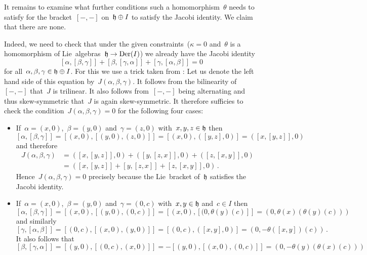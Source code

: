 \begin{example}
  It remains to examine what further conditions such a homomorphism~$\theta$ needs to satisfy for the bracket~$[-,-]$ on~$\mathfrak{h} \oplus I$ to satisfy the Jacobi identity.
  We claim that there are none.
  
  Indeed, we need to check that under the given constraints~($\kappa = 0$ and~$\theta$ is a homomorphism of Lie~algebras~$\mathfrak{h} \to \operatorname{Der}(I)$) we already have the Jacobi identity
  \[
      [\alpha, [\beta, \gamma]]
    + [\beta, [\gamma, \alpha]]
    + [\gamma, [\alpha, \beta]]
    =
    0
  \]
  for all~$\alpha, \beta, \gamma \in \mathfrak{h} \oplus I$.
  For this we use a trick taken from \cite{semidirect_jacobi}:
  Let us denote the left hand side of this equation by~$J(\alpha, \beta, \gamma)$.
  It follows from the bilinearity of~$[-,-]$ that~$J$ is trilinear.
  It also follows from~$[-,-]$ being alternating and thus skew-symmetric that~$J$ is again skew-symmetric.
  It therefore sufficies to check the condition~$J(\alpha, \beta, \gamma) = 0$ for the following four cases:
  \begin{itemize}
    \item
      If~$\alpha = (x,0)$,~$\beta = (y,0)$ and~$\gamma = (z,0)$ with~$x, y, z \in \mathfrak{h}$ then
      \[
        [\alpha, [\beta, \gamma]]
        =
        [(x,0), [(y,0), (z,0)]]
        =
        [(x,0), ([y,z], 0)]
        =
        ([x,[y,z]], 0)
      \]
      and therefore
      \begin{align*}
        J(\alpha, \beta, \gamma)
        &=
          ([x,[y,z]], 0)
        + ([y,[z,x]], 0)
        + ([z,[x,y]], 0)
        \\
        &=
        ([x,[y,z]] + [y,[z,x]] + [z,[x,y]], 0)  \,.
      \end{align*}
      Hence~$J(\alpha, \beta, \gamma) = 0$ precisely because the Lie~bracket of~$\mathfrak{h}$ satisfies the Jacobi identity.
    \item
      If~$\alpha = (x,0)$,~$\beta = (y,0)$ and~$\gamma = (0,c)$ with~$x, y \in \mathfrak{h}$ and~$c \in I$ then
      \[
        [\alpha, [\beta, \gamma]]
        =
        [(x,0), [(y,0), (0,c)]]
        =
        [(x,0), [(0, \theta(y)(c)]]
        =
        ( 0, \theta(x)(\theta(y)(c)) )
      \]
      and similarly
      \[
        [\gamma, [\alpha, \beta]]
        =
        [(0,c), [(x,0), (y,0)]]
        =
        [(0,c), ([x,y], 0)]
        =
        ( 0, -\theta([x,y])(c) ) \,.
      \]
      It also follows that
      \[
        [\beta, [\gamma, \alpha]]
        =
        [(y,0), [(0,c), (x,0)]]
        =
        -[(y,0), [(x,0), (0,c)]]
        =
        ( 0, -\theta(y)(\theta(x)(c)) )
\]
\end{itemize}
\end{example}
